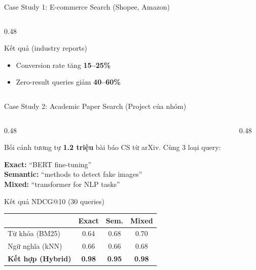 \documentclass[aspectratio=169, 11pt]{beamer}
\begin{document}
\begin{frame}{Case Study 1: E-commerce Search (Shopee, Amazon)}
\begin{columns}[T]
\begin{column}{0.48\textwidth}
\begin{block}{Kết quả (industry reports)}
{\small
\begin{itemize}
    \item Conversion rate tăng \textbf{15--25\%}
    \item Zero-result queries giảm \textbf{40--60\%}
\end{itemize}
}
\end{block}

\end{column}
\end{columns}
\end{frame}

\begin{frame}{Case Study 2: Academic Paper Search (Project của nhóm)}

\begin{columns}[T]
\begin{column}{0.48\textwidth}

\begin{block}{Bối cảnh tương tự}
{\scriptsize \textbf{1.2 triệu} bài báo CS từ arXiv. Cùng 3 loại query:}
\end{block}

\vspace{0.05cm}

{\scriptsize
\textbf{Exact:} ``BERT fine-tuning'' \\
\textbf{Semantic:} ``methods to detect fake images'' \\
\textbf{Mixed:} ``transformer for NLP tasks''
}

\vspace{0.1cm}

\begin{exampleblock}{Kết quả NDCG@10 (30 queries)}
{\scriptsize
\begin{tabular}{l c c c}
\toprule
& \textbf{Exact} & \textbf{Sem.} & \textbf{Mixed} \\
\midrule
Từ khóa (BM25) & 0.64 & 0.68 & 0.70 \\
Ngữ nghĩa (kNN) & 0.66 & 0.66 & 0.68 \\
\rowcolor{highlightRow}
\textcolor{accentTeal}{\textbf{Kết hợp (Hybrid)}} & \textcolor{accentTeal}{\textbf{0.98}} & \textcolor{accentTeal}{\textbf{0.95}} & \textcolor{accentTeal}{\textbf{0.98}} \\
\bottomrule
\end{tabular}
}
\end{exampleblock}

\end{column}
\begin{column}{0.48\textwidth}


\end{column}
\end{columns}
\end{frame}
\end{document}

